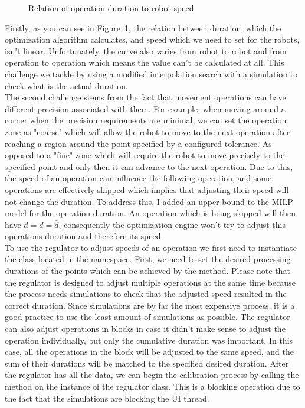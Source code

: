 \begin{figure}[H]
	\caption{Relation of operation duration to robot speed}
	\centering
	
	\label{fig:SpeedVsDuration}
\end{figure}

Firstly, as you can see in Figure~\ref{fig:SpeedVsDuration}, the relation between duration, which the optimization algorithm calculates, and speed which we need to set for the robots, isn't linear. Unfortunately, the curve also varies from robot to robot and from operation to operation which means the value can't be calculated at all. This challenge we tackle by using a modified interpolation search with a simulation to check what is the actual duration. \\

The second challenge stems from the fact that movement operations can have different precision associated with them. For example, when moving around a corner when the precision requirements are minimal, we can set the operation zone as "coarse" which will allow the robot to move to the next operation after reaching a region around the point specified by a configured tolerance. As opposed to a "fine" zone which will require the robot to move precisely to the specified point and only then it can advance to the next operation. Due to this, the speed of an operation can influence the following operation, and some operations are effectively skipped which implies that adjusting their speed will not change the duration. To address this, I added an upper bound to the MILP model for the operation duration. An operation which is being skipped will then have $\underline{d} = d = \overline{d}$, consequently the optimization engine won't try to adjust this operations duration and therefore its speed. \\

To use the regulator to adjust speeds of an operation we first need to instantiate the  class located in the  namespace. First, we need to set the desired processing durations of the points which can be achieved by the  method. Please note that the regulator is designed to adjust multiple operations at the same time because the process needs simulations to check that the adjusted speed resulted in the correct duration. Since simulations are by far the most expensive process, it is a good practice to use the least amount of simulations as possible. The regulator can also adjust operations in blocks in case it didn't make sense to adjust the operation individually, but only the cumulative duration was important. In this case, all the operations in the block will be adjusted to the same speed, and the sum of their durations will be matched to the specified desired duration. After the regulator has all the data, we can begin the calibration process by calling the  method on the instance of the regulator class. This is a blocking operation due to the fact that the simulations are blocking the UI thread. \\

